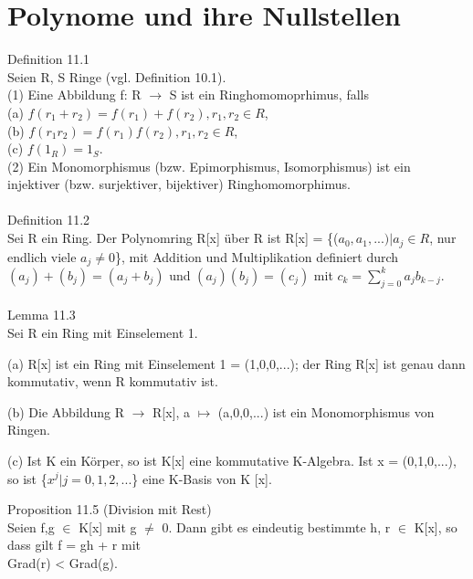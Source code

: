 \section{Polynome und ihre Nullstellen}
Definition 11.1\\
Seien R, S Ringe (vgl. Definition 10.1).\\
(1) Eine Abbildung f: R $\to$ S ist ein Ringhomomoprhimus, falls\\
\hspace*{6.5mm}(a) $f(r_1 +r_2) = f(r_1) + f(r_2), r_1,r_2 \in R$,\\
\hspace*{6.5mm}(b) $f(r_1r_2) = f(r_1)f(r_2), r_1,r_2 \in R$,\\
\hspace*{6.5mm}(c) $f(1_R) = 1_S$.\\
(2) Ein Monomorphismus (bzw. Epimorphismus, Isomorphismus) ist ein injektiver (bzw. surjektiver, bijektiver) \hspace*{4.5mm} Ringhomomorphimus.\\
\\
Definition 11.2\\
Sei R ein Ring. Der Polynomring R[x] über R ist R[x] = \{($a_0,a_1,...) | a_j \in R$, nur endlich viele $a_j \neq 0$\},
mit Addition und Multiplikation definiert durch $(a_j) + (b_j) = (a_j + b_j)$ und $(a_j)(b_j) = (c_j)$ mit $c_k = \sum\nolimits_{j=0}^{k} a_j b_{k-j}$.\\
\\
Lemma 11.3\\
Sei R ein Ring mit Einselement 1.
\begin{compactenum}
\item[(a)] R[x] ist ein Ring mit Einselement 1 = (1,0,0,...); der Ring R[x] ist genau dann kommutativ, wenn R kommutativ ist.
\item[(b)] Die Abbildung R $\to$ R[x], a $\mapsto$ (a,0,0,...) ist ein Monomorphismus von Ringen.
\item[(c)] Ist K ein Körper, so ist K[x] eine kommutative K-Algebra. Ist x = (0,1,0,...), so ist \{$x^j | j = 0,1,2,...$\} eine K-Basis von K [x].\\
\end{compactenum}
Proposition 11.5 (Division mit Rest)\\
Seien f,g $\in$ K[x] mit g $\neq$ 0. Dann gibt es eindeutig bestimmte h, r $\in$ K[x], so dass gilt f = gh + r mit \\Grad(r) < Grad(g).\\
\\
